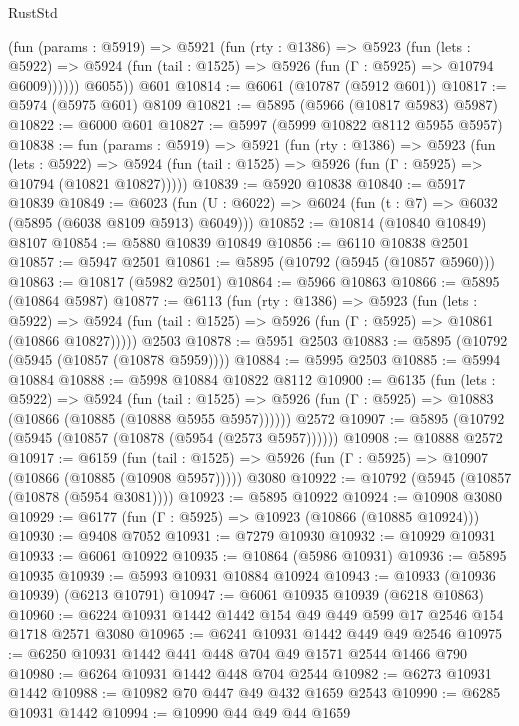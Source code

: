 \begin{lexlean}{RustStd}
\begin{coremodule}
{\begin{coremodule}
{{{{{{{{{{{{{{{{{{{{{{{{{{{{{{{{{{{          (fun (params : @5919) =>
          @5921
            (fun (rty : @1386) =>
            @5923
              (fun (lets : @5922) =>
              @5924 (fun (tail : @1525) => @5926 (fun (Γ : @5925) => @10794 @6009))))))
        @6055))
    @601
@10814 := @6061 (@10787 (@5912 @601))
@10817 := @5974 (@5975 @601) @8109
@10821 := @5895 (@5966 (@10817 @5983) @5987)
@10822 := @6000 @601
@10827 := @5997 (@5999 @10822 @8112 @5955 @5957)
@10838 := fun (params : @5919) =>
  @5921
    (fun (rty : @1386) =>
    @5923
      (fun (lets : @5922) =>
      @5924 (fun (tail : @1525) => @5926 (fun (Γ : @5925) => @10794 (@10821 @10827)))))
@10839 := @5920 @10838
@10840 := @5917 @10839
@10849 := @6023 (fun (U : @6022) => @6024 (fun (t : @7) => @6032 (@5895 (@6038 @8109 @5913) @6049)))
@10852 := @10814 (@10840 @10849) @8107
@10854 := @5880 @10839 @10849
@10856 := @6110 @10838 @2501
@10857 := @5947 @2501
@10861 := @5895 (@10792 (@5945 (@10857 @5960)))
@10863 := @10817 (@5982 @2501)
@10864 := @5966 @10863
@10866 := @5895 (@10864 @5987)
@10877 := @6113
    (fun (rty : @1386) =>
    @5923
      (fun (lets : @5922) =>
      @5924 (fun (tail : @1525) => @5926 (fun (Γ : @5925) => @10861 (@10866 @10827)))))
    @2503
@10878 := @5951 @2503
@10883 := @5895 (@10792 (@5945 (@10857 (@10878 @5959))))
@10884 := @5995 @2503
@10885 := @5994 @10884
@10888 := @5998 @10884 @10822 @8112
@10900 := @6135
    (fun (lets : @5922) =>
    @5924
      (fun (tail : @1525) =>
      @5926 (fun (Γ : @5925) => @10883 (@10866 (@10885 (@10888 @5955 @5957))))))
    @2572
@10907 := @5895 (@10792 (@5945 (@10857 (@10878 (@5954 (@2573 @5957))))))
@10908 := @10888 @2572
@10917 := @6159
    (fun (tail : @1525) => @5926 (fun (Γ : @5925) => @10907 (@10866 (@10885 (@10908 @5957)))))
    @3080
@10922 := @10792 (@5945 (@10857 (@10878 (@5954 @3081))))
@10923 := @5895 @10922
@10924 := @10908 @3080
@10929 := @6177 (fun (Γ : @5925) => @10923 (@10866 (@10885 @10924)))
@10930 := @9408 @7052
@10931 := @7279 @10930
@10932 := @10929 @10931
@10933 := @6061 @10922
@10935 := @10864 (@5986 @10931)
@10936 := @5895 @10935
@10939 := @5993 @10931 @10884 @10924
@10943 := @10933 (@10936 @10939) (@6213 @10791)
@10947 := @6061 @10935 @10939 (@6218 @10863)
@10960 := @6224 @10931 @1442 @1442 @154 @49 @449 @599 @17 @2546 @154 @1718 @2571 @3080
@10965 := @6241 @10931 @1442 @449 @49 @2546
@10975 := @6250 @10931 @1442 @441 @448 @704 @49 @1571 @2544 @1466 @790
@10980 := @6264 @10931 @1442 @448 @704 @2544
@10982 := @6273 @10931 @1442
@10988 := @10982 @70 @447 @49 @432 @1659 @2543
@10990 := @6285 @10931 @1442
@10994 := @10990 @44 @49 @44 @1659
}}}}}}}}}}}}}}}}}}}}}}}}}}}}}}}}}}}
\end{coremodule}}
\end{coremodule}
\end{lexlean}
